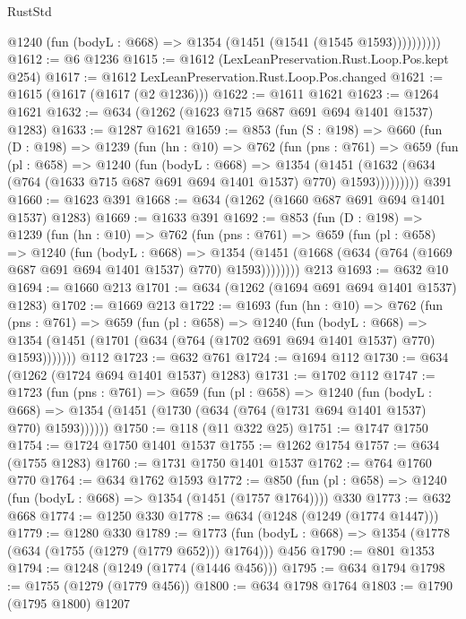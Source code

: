 \begin{lexlean}{RustStd}
\begin{coremodule}
{\begin{coremodule}
{{{{{{{{              @1240 (fun (bodyL : @668) => @1354 (@1451 (@1541 (@1545 @1593))))))))))
@1612 := @6 @1236
@1615 := @1612 (LexLeanPreservation.Rust.Loop.Pos.kept @254)
@1617 := @1612 LexLeanPreservation.Rust.Loop.Pos.changed
@1621 := @1615 (@1617 (@1617 (@2 @1236)))
@1622 := @1611 @1621
@1623 := @1264 @1621
@1632 := @634 (@1262 (@1623 @715 @687 @691 @694 @1401 @1537) @1283)
@1633 := @1287 @1621
@1659 := @853
    (fun (S : @198) =>
    @660
      (fun (D : @198) =>
      @1239
        (fun (hn : @10) =>
        @762
          (fun (pns : @761) =>
          @659
            (fun (pl : @658) =>
            @1240
              (fun (bodyL : @668) =>
              @1354
                (@1451
                  (@1632 (@634 (@764 (@1633 @715 @687 @691 @694 @1401 @1537) @770) @1593)))))))))
    @391
@1660 := @1623 @391
@1668 := @634 (@1262 (@1660 @687 @691 @694 @1401 @1537) @1283)
@1669 := @1633 @391
@1692 := @853
    (fun (D : @198) =>
    @1239
      (fun (hn : @10) =>
      @762
        (fun (pns : @761) =>
        @659
          (fun (pl : @658) =>
          @1240
            (fun (bodyL : @668) =>
            @1354 (@1451 (@1668 (@634 (@764 (@1669 @687 @691 @694 @1401 @1537) @770) @1593))))))))
    @213
@1693 := @632 @10
@1694 := @1660 @213
@1701 := @634 (@1262 (@1694 @691 @694 @1401 @1537) @1283)
@1702 := @1669 @213
@1722 := @1693
    (fun (hn : @10) =>
    @762
      (fun (pns : @761) =>
      @659
        (fun (pl : @658) =>
        @1240
          (fun (bodyL : @668) =>
          @1354 (@1451 (@1701 (@634 (@764 (@1702 @691 @694 @1401 @1537) @770) @1593)))))))
    @112
@1723 := @632 @761
@1724 := @1694 @112
@1730 := @634 (@1262 (@1724 @694 @1401 @1537) @1283)
@1731 := @1702 @112
@1747 := @1723
    (fun (pns : @761) =>
    @659
      (fun (pl : @658) =>
      @1240
        (fun (bodyL : @668) =>
        @1354 (@1451 (@1730 (@634 (@764 (@1731 @694 @1401 @1537) @770) @1593))))))
@1750 := @118 (@11 @322 @25)
@1751 := @1747 @1750
@1754 := @1724 @1750 @1401 @1537
@1755 := @1262 @1754
@1757 := @634 (@1755 @1283)
@1760 := @1731 @1750 @1401 @1537
@1762 := @764 @1760 @770
@1764 := @634 @1762 @1593
@1772 := @850 (fun (pl : @658) => @1240 (fun (bodyL : @668) => @1354 (@1451 (@1757 @1764)))) @330
@1773 := @632 @668
@1774 := @1250 @330
@1778 := @634 (@1248 (@1249 (@1774 @1447)))
@1779 := @1280 @330
@1789 := @1773 (fun (bodyL : @668) => @1354 (@1778 (@634 (@1755 (@1279 (@1779 @652))) @1764))) @456
@1790 := @801 @1353
@1794 := @1248 (@1249 (@1774 (@1446 @456)))
@1795 := @634 @1794
@1798 := @1755 (@1279 (@1779 @456))
@1800 := @634 @1798 @1764
@1803 := @1790 (@1795 @1800) @1207
}}}}}}}}
\end{coremodule}}
\end{coremodule}
\end{lexlean}
